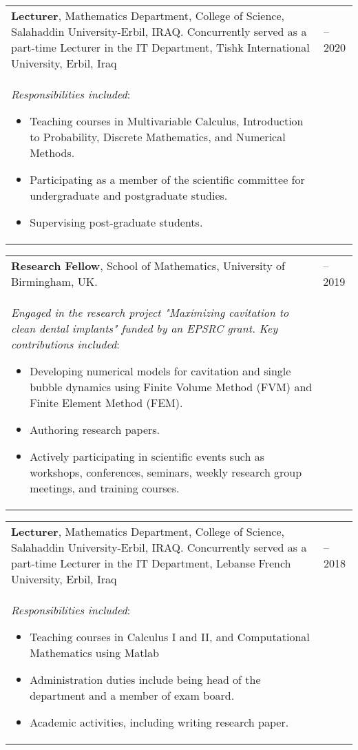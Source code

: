 \documentclass[line]{res}
\newenvironment{p1}
{\begin{adjustwidth}{-30pt}{0pt}
\vspace{8pt}}
{\end{adjustwidth}}
\begin{document}
\begin{resume}
\begin{p1}
\vspace{5pt}
\begin{tabular}{p{} >{\raggedleft\arraybackslash}p{}}
	\textbf{Lecturer}, Mathematics Department, College of Science, Salahaddin University-Erbil, IRAQ.  Concurrently served as a part-time Lecturer in the IT Department, Tishk International University, Erbil, Iraq& 2019--2020 \\
	\textit{Responsibilities included}:
	\begin{itemize}
		\item Teaching courses in Multivariable Calculus, Introduction to Probability, Discrete Mathematics, and Numerical Methods.
		\item Participating as a member of the scientific committee for undergraduate and postgraduate studies.
		\item Supervising post-graduate students.	
	\end{itemize}
\end{tabular}

\begin{tabular}{p{} >{\raggedleft\arraybackslash}p{}}
	\textbf{Research Fellow}, School of Mathematics, University of Birmingham, UK. & 2018--2019 \\
	\textit{Engaged in the research project "Maximizing cavitation to clean dental implants" funded by an EPSRC grant. Key contributions included}:
	\begin{itemize}
		\item Developing numerical models for cavitation and single bubble dynamics using Finite Volume Method (FVM) and Finite Element Method (FEM).
		\item Authoring research papers.
		\item Actively participating in scientific events such as workshops, conferences, seminars, weekly research group meetings, and training courses.
	\end{itemize}
\end{tabular}
\vspace{3pt}
\begin{tabular}{p{} >{\raggedleft\arraybackslash}p{}}
	\textbf{Lecturer}, Mathematics Department, College of Science, Salahaddin University-Erbil, IRAQ.  Concurrently served as a part-time Lecturer in the IT Department, Lebanse French University, Erbil, Iraq& 2015--2018 \\
	\textit{Responsibilities included}:
	\begin{itemize}
		\item Teaching courses in Calculus I and II, and Computational Mathematics using Matlab
		\item Administration duties include being head of the department and a member of exam board.
		\item Academic activities, including writing research paper.	
	\end{itemize}
\end{tabular}


\end{p1}
\end{resume}
\end{document}

